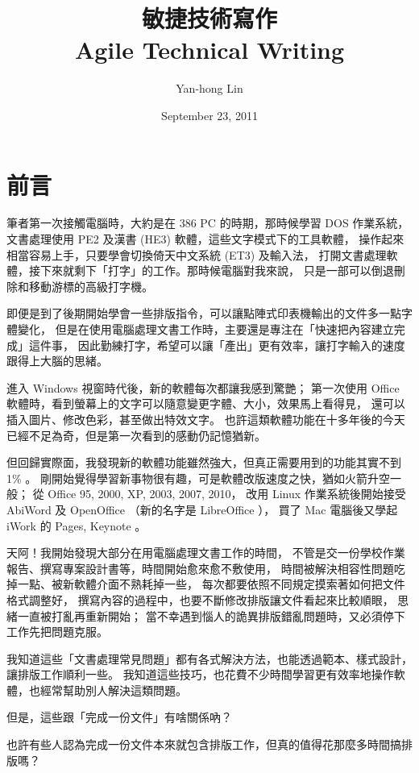 \documentclass[a4paper,12pt,english]{sphinxmanual}
\title{敏捷技術寫作\\Agile Technical Writing}
\date{September 23, 2011}
\author{Yan-hong Lin}
\begin{document}
\maketitle
\tableofcontents
{}\label{index::doc}



\chapter{前言}
\label{preface::doc}\label{preface:agile-technical-writing}\label{preface:id1}
筆者第一次接觸電腦時，大約是在 386 PC 的時期，那時候學習 DOS 作業系統，
文書處理使用 PE2 及漢書 (HE3) 軟體，這些文字模式下的工具軟體，
操作起來相當容易上手，只要學會切換倚天中文系統 (ET3) 及輸入法，
打開文書處理軟體，接下來就剩下「打字」的工作。那時候電腦對我來說，
只是一部可以倒退刪除和移動游標的高級打字機。

即便是到了後期開始學會一些排版指令，可以讓點陣式印表機輸出的文件多一點字體變化，
但是在使用電腦處理文書工作時，主要還是專注在「快速把內容建立完成」這件事，
因此勤練打字，希望可以讓「產出」更有效率，讓打字輸入的速度跟得上大腦的思緒。

進入 Windows 視窗時代後，新的軟體每次都讓我感到驚艷；
第一次使用 Office 軟體時，看到螢幕上的文字可以隨意變更字體、大小，效果馬上看得見，
還可以插入圖片、修改色彩，甚至做出特效文字。
也許這類軟體功能在十多年後的今天已經不足為奇，但是第一次看到的感動仍記憶猶新。

但回歸實際面，我發現新的軟體功能雖然強大，但真正需要用到的功能其實不到 1\% 。
剛開始覺得學習新事物很有趣，可是軟體改版速度之快，猶如火箭升空一般；
從 Office 95, 2000, XP, 2003, 2007, 2010，
改用 Linux 作業系統後開始接受 AbiWord 及 OpenOffice （新的名字是 LibreOffice ），
買了 Mac 電腦後又學起 iWork 的 Pages, Keynote 。

天阿！我開始發現大部分在用電腦處理文書工作的時間，
不管是交一份學校作業報告、撰寫專案設計書等，時間開始愈來愈不敷使用，
時間被解決相容性問題吃掉一點、被新軟體介面不熟耗掉一些，
每次都要依照不同規定摸索著如何把文件格式調整好，
撰寫內容的過程中，也要不斷修改排版讓文件看起來比較順眼，
思緒一直被打亂再重新開始；
當不幸遇到惱人的詭異排版錯亂問題時，又必須停下工作先把問題克服。

我知道這些「文書處理常見問題」都有各式解決方法，也能透過範本、樣式設計，讓排版工作順利一些。
我知道這些技巧，也花費不少時間學習更有效率地操作軟體，也經常幫助別人解決這類問題。

但是，這些跟「完成一份文件」有啥關係吶？

也許有些人認為完成一份文件本來就包含排版工作，但真的值得花那麼多時間搞排版嗎？
\end{document}
